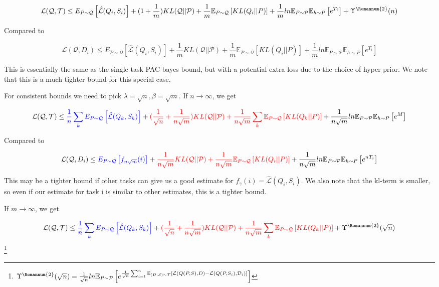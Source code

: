\documentclass[letterpaper]{article}
\theoremstyle{definition}
\begin{document}
$$\mathcal{L}(\mathcal{Q}, \mathcal{T}) \leq  E_{P\sim \mathcal{Q}}  \left [ \hat{\mathcal{L}}(Q_i,S_i) \right ] + (1+\frac{1}{m})KL(\mathcal{Q}||\mathcal{P}) + \frac{1}{m}\mathbb{E}_{P\sim \mathcal{Q}} \left [KL(Q_i||P)\right ] + \frac{1}{m} ln\mathbb{E}_{P\sim \mathcal{P}}\mathbb{E}_{h\sim P}\left [ e^{T_i} \right ] + \Upsilon^{\text{\Romannum{2}}}(n)$$

Compared to 


$$\mathcal{L}(\mathcal{Q}, D_i)\leq E_{P\sim \mathcal{Q}}  \left [ \hat{\mathcal{L}}(Q_i,S_i) \right ] + \frac{1}{m}KL(\mathcal{Q}||\mathcal{P}) + \frac{1}{m}\mathbb{E}_{P\sim \mathcal{Q}} \left [KL(Q_i||P)\right ] + \frac{1}{m} ln\mathbb{E}_{P\sim \mathcal{P}}\mathbb{E}_{h\sim P}\left [ e^{T_i} \right ] $$

This is essentially the same as the single task PAC-bayes bound, but with a potential extra loss due to the choice of hyper-prior. We note that this is a much tighter bound for this special case.

For consistent bounds we need to pick $\lambda=\sqrt{n}, \beta=\sqrt{m}$. 
If $n\rightarrow\infty$, we get 

$$\mathcal{L}(\mathcal{Q}, \mathcal{T}) \leq \textcolor{blue}{\frac{1}{n}\sum_k E_{P\sim \mathcal{Q}} \left [ \hat{\mathcal{L}}(Q_k,S_k) \right ]} + \textcolor{red}{(\frac{1}{\sqrt{n}}+\frac{1}{n\sqrt{m}})KL(\mathcal{Q}||\mathcal{P})+\frac{1}{n\sqrt{m}}\sum_k \mathbb{E}_{P\sim \mathcal{Q}} \left [KL(Q_k||P) \right ]} + \frac{1}{n\sqrt{m}} ln\mathbb{E}_{P\sim \mathcal{P}}\mathbb{E}_{h\sim P}\left [ e^{M} \right ]$$

Compared to 

$$\mathcal{L}(\mathcal{Q}, D_i)\leq \textcolor{blue}{E_{P\sim \mathcal{Q}}  \left [ f_{n\sqrt{m}}(i) \right ]}  + \textcolor{red}{\frac{1}{n\sqrt{m}}KL(\mathcal{Q}||\mathcal{P})+\frac{1}{n\sqrt{m}}\mathbb{E}_{P\sim \mathcal{Q}} \left [KL(Q_i||P)\right ]} + \frac{1}{n\sqrt{m}} ln\mathbb{E}_{P\sim \mathcal{P}}\mathbb{E}_{h\sim P}\left [ e^{nT_i}\right ]  $$

This may be a tighter bound if other tasks can give us a good estimate for $f_{\gamma}(i)=\hat{\mathcal{L}}(Q_i,S_i)$. We also note that the kl-term is smaller, so even if our estimate for task i is similar to other estimates, this is a tighter bound.

If $m\rightarrow\infty$, we get

$$\mathcal{L}(\mathcal{Q}, \mathcal{T}) \leq \textcolor{blue}{\frac{1}{n}\sum_k E_{P\sim \mathcal{Q}} \left [ \hat{\mathcal{L}}(Q_k,S_k) \right ]}+ \textcolor{red}{(\frac{1}{\sqrt{n}}+\frac{1}{n\sqrt{m}})KL(\mathcal{Q}||\mathcal{P})+\frac{1}{n\sqrt{m}}\sum_k \mathbb{E}_{P\sim \mathcal{Q}} \left [KL(Q_k||P) \right ]} + \Upsilon^{\text{\Romannum{2}}}(\sqrt{n})$$
\footnote{$\Upsilon^{\text{\Romannum{2}}}(\sqrt{n})=\frac{1}{\sqrt{n}}ln \mathbb{E}_{P\sim \mathcal{P}} \left [e^{\frac{1}{\sqrt{n}}\sum_{i=1}^{n}\mathbb{E}_{(D,S)\sim \mathcal{T}}\left [\mathcal{L}(Q(P,S),D)- \mathcal{L}(Q(P, S_i), \mathcal{D}_i)\right ]} \right ]$}
\end{document}
